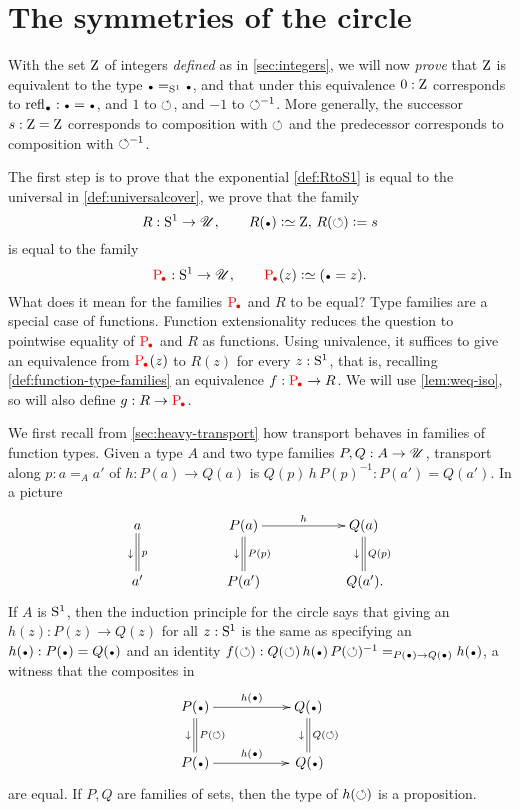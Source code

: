 \section{The symmetries of the circle}
\label{sec:symcirc}

With the set $\mathrm{Z}$ of integers \emph{defined} as in \cref{sec:integers}, 
we will now \emph{prove} that $\mathrm{Z}$ is equivalent to the type 
$\base=_{\Sc}\base$, and that under this equivalence $0:\mathrm{Z}$ corresponds to 
$\refl{\base}:\base=\base$, and $1$ to $\circlearrowleft$, and $-1$ to $\circlearrowleft^{-1}$. 
More generally, the successor ${s}:\mathrm{Z}=\mathrm{Z}$ corresponds to composition with $\circlearrowleft$
and the predecessor corresponds to composition with $\circlearrowleft^{-1}$.

The first step is to prove that the exponential \covering \cref{def:RtoS1} 
is equal to the universal \covering in \cref{def:universalcover}, 
\ie we prove that the family 
\[
R: \Sc\to\UU,\qquad R(\base)\defeq\zet,\, R(\Sloop)\defis \etop{s}
\]
is equal to the family
\[
\uc{\base}:\Sc\to\UU,\qquad \uc{\base}(z)\defeq (\base=z).
\]
What does it mean for the families $\uc{\base}$ and $R$ to be equal?
Type families are a special case of functions. 
Function extensionality reduces the question to pointwise equality
of $\uc{\base}$ and $R$ as functions.
Using univalence, it suffices to give
an equivalence from $\uc{\base}(z)$ to $R(z)$ for every $z:{\mathrm{S}^1}$,
that is, recalling \cref{def:function-type-families}
an equivalence $f: \uc{\base}\to R$. We will use
\cref{lem:weq-iso}, so will also define $g: R\to\uc{\base}$.

We first recall from \cref{sec:heavy-transport} how 
transport behaves in families of function types.  
Given a type $A$ and two type families $P,Q:A\to{\mathscr{U}}$,  
transport along $p:a=_Aa'$ of $h:P(a)\to Q(a)$ is $Q(p)\,h\,P(p)^{-1}:P(a')=Q(a')$.
In a picture
\[
\xymatrix{
a\ar@{=}[d]^{p}_\downarrow &&
P(a)\ar[rr]^{h}\ar@{=}[d]^{P(p)}_\downarrow&&
Q(a)\ar@{=}[d]^{Q(p)}_\downarrow\\
a'&&P(a')&&\,Q(a').}
\]
If $A$ is ${\mathrm{S}^1}$, then the induction principle for the circle says 
that giving an $h(z):P(z)\to Q(z)$ for all $z:{\mathrm{S}^1}$ is the same as 
specifying an $h(\base):P(\base)=Q(\base)$ and an identity 
$f(\Sloop):Q(\Sloop)\,h(\base)\,P(\Sloop)^{-1}=_{P(\base)\to Q(\base)}h(\base)$,
\ie   a witness that the composites in 
$$\xymatrix{
  P(\base)\ar[rr]^{h(\base)}\ar@{=}[d]^{P(\Sloop)}_\downarrow
 &&Q(\base)\ar@{=}[d]^{Q(\Sloop)}_\downarrow\\
  P(\base)\ar[rr]^{h(\base)}&&\,Q(\base)}
$$
are equal. If $P,Q$ are families of sets, 
then the type of $h(\circlearrowleft)$ is a proposition.

